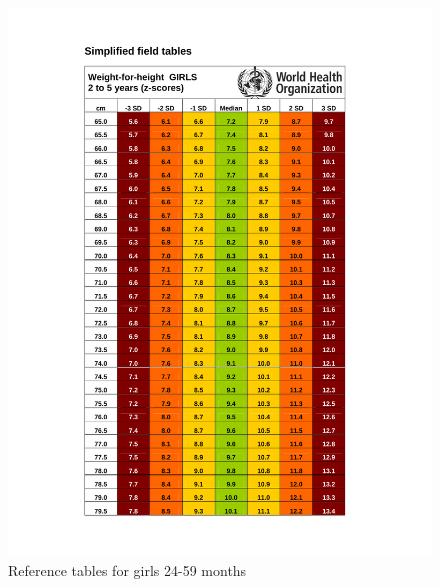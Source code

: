 \documentclass[
  12pt,
]{book}
\begin{document}
\begin{figure}[H]

{\centering \includegraphics[width=1\linewidth]{pdf/girls_24_60} 

}

\caption{Reference tables for girls 24-59 months}\label{fig:anthro1-4}
\end{figure}
\end{document}

